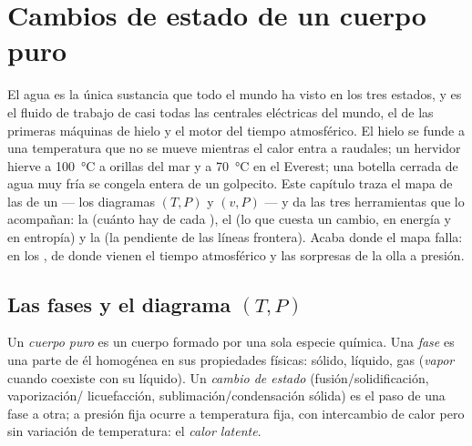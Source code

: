 \chapter{Cambios de estado de un cuerpo puro}\label{ch:b1:phase-changes}

El agua es la única sustancia que todo el mundo ha visto en los tres
estados, y es el fluido de trabajo de casi todas las centrales
eléctricas del mundo, el  de las primeras máquinas de hielo
y el motor del tiempo atmosférico. El hielo se funde a una temperatura
que no se mueve mientras el calor entra a raudales; un hervidor hierve a
\qty{100}{\degreeCelsius} a orillas del mar y a \qty{70}{\degreeCelsius}
en el Everest; una botella cerrada de agua muy fría se congela entera de
un golpecito. Este capítulo traza el mapa de las  de un 
--- los diagramas $(T, P)$ y $(v, P)$ --- y da las tres herramientas que
lo acompañan: la  (cuánto hay de cada ), el  (lo que cuesta un cambio, en energía y en entropía) y la
 (la pendiente de las líneas frontera).
Acaba donde el mapa falla: en los , de donde vienen
el tiempo atmosférico y las sorpresas de la olla a presión.

\section{Las fases y el diagrama $(T, P)$}

\begin{definition}\label{def:b1:phase-changes:phase}
Un \emph{cuerpo puro} es un cuerpo formado por una sola especie química.
Una \emph{fase} es una parte de él homogénea en sus propiedades físicas:
sólido, líquido, gas (\emph{vapor} cuando coexiste con su líquido). Un
\emph{cambio de estado} (fusión/solidificación, vaporización/
licuefacción, sublimación/condensación sólida) es el paso de una fase a
otra; a presión fija ocurre a temperatura fija, con intercambio de calor
pero sin variación de temperatura: el \emph{calor latente}.
\end{definition}

